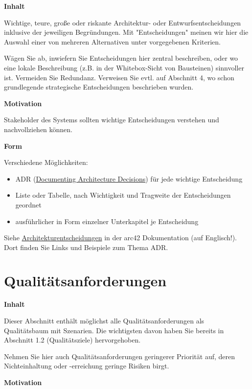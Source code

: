 \documentclass[
]{article}
\begin{document}
\textbf{Inhalt}

Wichtige, teure, große oder riskante Architektur- oder
Entwurfsentscheidungen inklusive der jeweiligen Begründungen. Mit
"Entscheidungen" meinen wir hier die Auswahl einer von mehreren
Alternativen unter vorgegebenen Kriterien.

Wägen Sie ab, inwiefern Sie Entscheidungen hier zentral beschreiben,
oder wo eine lokale Beschreibung (z.B. in der Whitebox-Sicht von
Bausteinen) sinnvoller ist. Vermeiden Sie Redundanz. Verweisen Sie evtl.
auf Abschnitt 4, wo schon grundlegende strategische Entscheidungen
beschrieben wurden.

\textbf{Motivation}

Stakeholder des Systems sollten wichtige Entscheidungen verstehen und
nachvollziehen können.

\textbf{Form}

Verschiedene Möglichkeiten:

\begin{itemize}
\item
  ADR
  (\href{https://cognitect.com/blog/2011/11/15/documenting-architecture-decisions}{Documenting
  Architecture Decisions}) für jede wichtige Entscheidung
\item
  Liste oder Tabelle, nach Wichtigkeit und Tragweite der Entscheidungen
  geordnet
\item
  ausführlicher in Form einzelner Unterkapitel je Entscheidung
\end{itemize}

Siehe
\href{https://docs.arc42.org/section-9/}{Architekturentscheidungen} in
der arc42 Dokumentation (auf Englisch!). Dort finden Sie Links und
Beispiele zum Thema ADR.

\hypertarget{section-quality-scenarios}{%
\section{Qualitätsanforderungen}\label{section-quality-scenarios}}

\textbf{Inhalt}

Dieser Abschnitt enthält möglichst alle Qualitätsanforderungen als
Qualitätsbaum mit Szenarien. Die wichtigsten davon haben Sie bereits in
Abschnitt 1.2 (Qualitätsziele) hervorgehoben.

Nehmen Sie hier auch Qualitätsanforderungen geringerer Priorität auf,
deren Nichteinhaltung oder -erreichung geringe Risiken birgt.

\textbf{Motivation}
\end{document}
